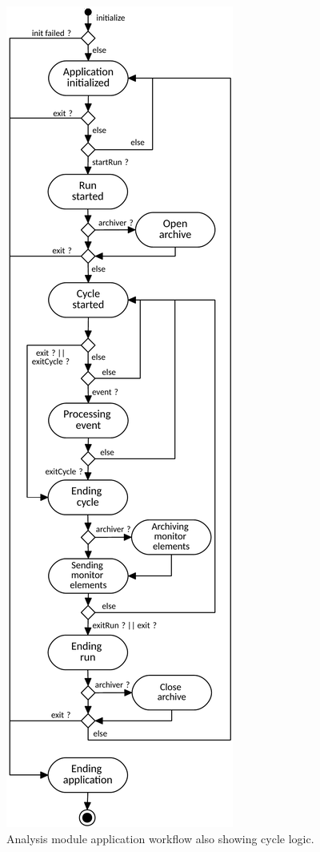 \documentclass[conference]{IEEEtran}
\begin{document}
\begin{figure}[htbp]
  \begin{center}
    \includegraphics[width=0.7\linewidth]{figs/AnalysisModuleApplicatonWorkflowDiagram.pdf}
    \caption{\label{fig:DQMCycleSystem} Analysis module application workflow also showing cycle logic.}
  \end{center}
\end{figure}
\end{document}
